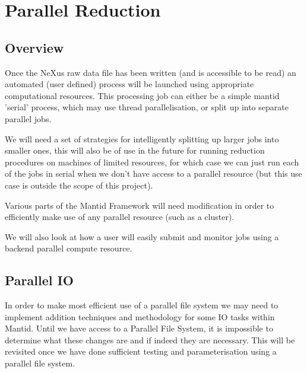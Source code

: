\section{Parallel Reduction}


\subsection{Overview}

Once the NeXus raw data file has been written (and is accessible to be read) an automated (user defined) process will be launched using appropriate computational resources.  This processing job can either be a simple mantid 'serial' process, which may use thread parallelisation, or split up into separate parallel jobs.  

We will need a set of strategies for intelligently splitting up larger jobs into smaller ones, this will also be of use in the future for running reduction procedures on machines of limited resources, for which case we can just run each of the jobs in serial when we don't have access to a parallel resource (but this use case is outside the scope of this project).

Various parts of the Mantid Framework will need modification in order to efficiently make use of any parallel resource (such as a cluster).  

We will also look at how a user will easily submit and monitor jobs using a backend parallel compute resource.






\subsection{Parallel IO}

In order to make most efficient use of a parallel file system we may need to implement addition techniques and methodology for some IO tasks within Mantid.  Until we have access to a Parallel File System, it is impossible to determine what these changes are and if indeed they are necessary.  
This will be revisited once we have done sufficient testing and parameterisation using a parallel file system.

